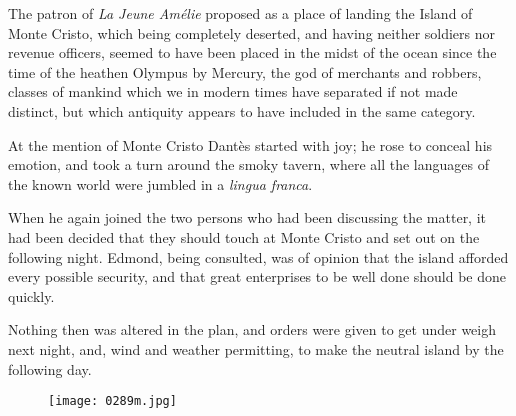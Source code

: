 The patron of \textit{La Jeune Amélie} proposed as a place of landing the
Island of Monte Cristo, which being completely deserted, and having
neither soldiers nor revenue officers, seemed to have been placed in
the midst of the ocean since the time of the heathen Olympus by
Mercury, the god of merchants and robbers, classes of mankind which we
in modern times have separated if not made distinct, but which
antiquity appears to have included in the same category.

At the mention of Monte Cristo Dantès started with joy; he rose to
conceal his emotion, and took a turn around the smoky tavern, where all
the languages of the known world were jumbled in a \textit{lingua franca}.

When he again joined the two persons who had been discussing the
matter, it had been decided that they should touch at Monte Cristo and
set out on the following night. Edmond, being consulted, was of opinion
that the island afforded every possible security, and that great
enterprises to be well done should be done quickly.

Nothing then was altered in the plan, and orders were given to get
under weigh next night, and, wind and weather permitting, to make the
neutral island by the following day.

\begin{figure}[ht]
\texttt{[image: 0289m.jpg]}
\end{figure}
